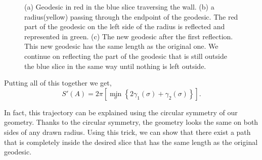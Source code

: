 \begin{figure}
\begin{subfigure}[b]{0.3\textwidth}
    \caption{}    
    \label{line 2}
    \end{subfigure}
    \hfill
    \begin{subfigure}[b]{0.3\textwidth}
        \centering
    \caption{}
    \label{line 3}
    \end{subfigure}
    \caption{(a) Geodesic in red in the blue slice traversing the wall. (b) a radius(yellow) passing through the endpoint of the geodesic. The red part of the geodesic on the left side of the radius is reflected and represented in green. (c) The new geodesic after the first reflection. This new geodesic has the same length as the original one. We continue on reflecting the part of the geodesic that is still outside the blue slice in the same way until nothing is left outside.}
    \label{reflection}
\end{figure}

Putting all of this together we get,
\begin{equation}\label{S2}
    S'\left(A\right) = 2\pi\left[\min_\sigma\left\{2\gamma_1(\sigma)+\gamma_2(\sigma)\right\}\right].
\end{equation}

In fact, this trajectory can be explained using the circular symmetry of our geometry. Thanks to the circular symmetry, the geometry looks the same on both sides of any drawn radius. Using this trick, we can show that there exist a path that is completely inside the desired slice that has the same length as the original geodesic.


